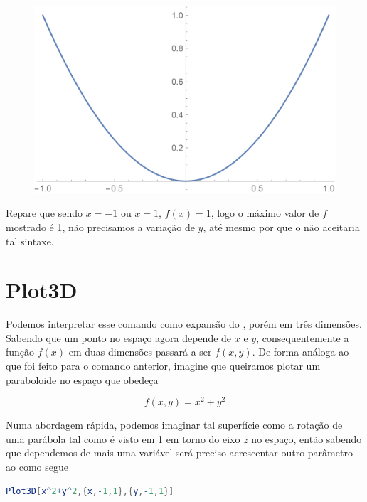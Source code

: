 \documentclass[a4paper, 12pt]{article}
\begin{document}
	\begin{figure}[!h]\label{parabola}
		\centering
		\includegraphics[scale=.5]{images/parabola}
	\end{figure}

	Repare que sendo $x=-1$ ou $x=1$, $f(x)=1$, logo o máximo valor de $f$ mostrado é 1, não precisamos a variação de $y$, até mesmo por que o  não aceitaria tal sintaxe. 
	
	\section{Plot3D}
	Podemos interpretar esse comando como expansão do , porém em três dimensões. Sabendo que um ponto no espaço agora depende de $x$ e $y$, consequentemente a função $f(x)$ em duas dimensões passará a ser $f(x,y)$. De forma análoga ao que foi feito para o comando anterior, imagine que queiramos plotar um paraboloide no espaço que obedeça
	
	\begin{equation}
		f(x,y)=x^2+y^2
	\end{equation}
	
	Numa abordagem rápida, podemos imaginar tal superfície como a rotação de uma parábola tal como é visto em \ref{parabola} em torno do eixo $z$ no espaço, então sabendo que dependemos de mais uma variável será preciso acrescentar outro parâmetro ao  como segue
	
	\begin{lstlisting}[language=Mathematica]
	Plot3D[x^2+y^2,{x,-1,1},{y,-1,1}]
	\end{lstlisting}
	
\end{document}
